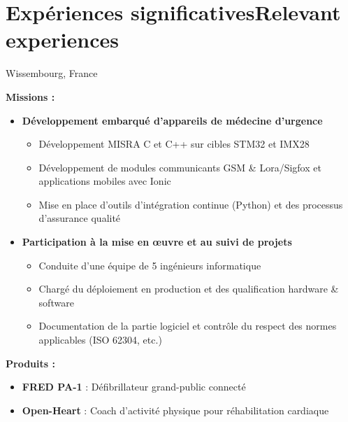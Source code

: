 \section{\ifnativelang Exp\'eriences significatives\else Relevant experiences\fi}

{}{}{Wissembourg, France}{
\ifnativelang
	\textcolor{color1}{\textbf{Missions :}}
	\begin{itemize}[leftmargin=\ListItemsMargins]
		\item \textbf{Développement embarqué d'appareils de médecine d’urgence}
		\begin{itemize}
			\item D\'eveloppement MISRA C et C++ sur cibles STM32 et IMX28
			\item D\'eveloppement de modules communicants GSM \& Lora/Sigfox et applications mobiles avec Ionic
			\item Mise en place d'outils d'intégration continue (Python) et des processus d'assurance qualit\'e
		\end{itemize}
		\item \textbf{Participation \`a la mise en \oe uvre et au suivi de projets}
		\begin{itemize}
			\ifaddmngt \item Conduite d’une équipe de 5 ingénieurs informatique  \fi
			\item Chargé du déploiement en production et des qualification hardware \& software
			\item Documentation de la partie logiciel et contrôle du respect des normes applicables (ISO 62304, etc.)
		\end{itemize}
	\end{itemize}
	\vspace{\ItemsMinSpacing}
	\textcolor{color1}{\textbf{Produits :}}
	\begin{itemize}[leftmargin=\ListItemsMargins]
		\item \textbf{FRED PA-1} : Défibrillateur grand-public connecté \textcolor{color1}{\href{http://www.schiller.ch/fr/fr/product/fred-pa-1}{\ExternalLink}}
		\item \textbf{Open-Heart} : Coach d'activit\'e physique pour r\'ehabilitation cardiaque \textcolor{color1}{\href{http://www.schiller.ch/fr/fr/schiller-\%C3\%A0-la-fine-pointe-de-la-sant\%C3\%A9-connect\%C3\%A9e}{\ExternalLink}}

\end{itemize}}

